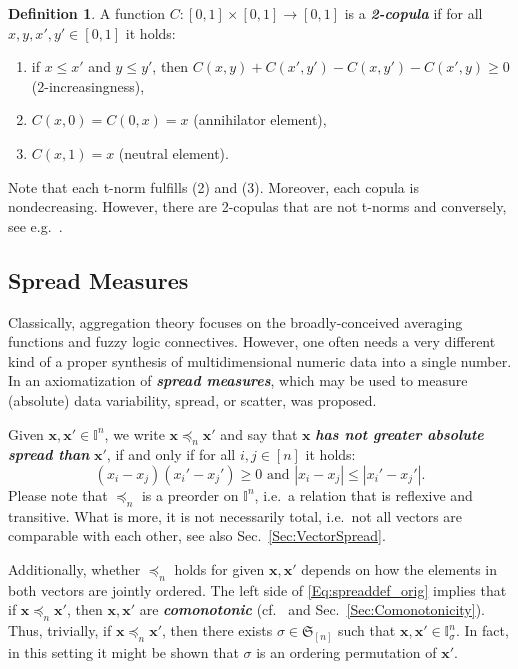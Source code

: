 \documentclass[11pt]{article}\usepackage[]{graphicx}\usepackage[]{color}
\renewcommand{\emph}[1]{\textbf{\textsl{#1}}}
\newcommand{\vect}[1]{{\mathbf{#1}}}
\newcommand{\IvalPow}[1]{\mathbb{I}^{#1}}
\theoremstyle{remark}
\theoremstyle{definition}
\newtheorem{definition}[theorem]{Definition}
\begin{document}
\begin{definition}\label{Def:tnorm}
A function $C: [0,1]\times[0,1]\to[0,1]$ is a \emph{2-copula}
if for all $x,y,x',y'\in[0,1]$ it holds:
\begin{enumerate}
\item if $x\le x'$ and $y\le y'$, then
$C(x,y)+C(x',y')-C(x,y')-C(x',y)\ge 0$ (2-increasingness),
\item $C(x, 0)=C(0,x)=x$ (annihilator element),
\item $C(x, 1)=x$ (neutral element).
\end{enumerate}
\end{definition}
Note that each t-norm fulfills (2) and (3).
Moreover, each copula is nondecreasing. However, there are 2-copulas
that are not t-norms and conversely, see e.g.~\cite{KlementMesiarPap2000:trinorm}.






\subsection{Spread Measures}\label{Sec:SpreadMeasures}


Classically, aggregation theory focuses on
the broadly-conceived averaging functions and fuzzy logic connectives.
However, one often needs a very different kind of a proper
synthesis of multidimensional numeric data into a single number.
In \cite{Gagolewski2015:spread} an axiomatization of
\emph{spread measures}, which may be used to measure (absolute) data
variability, spread, or scatter, was proposed.


Given $\vect{x},\vect{x}'\in\IvalPow{n}$,
we write $\vect{x}\preccurlyeq_n\vect{x}'$
and say that $\vect{x}$ \emph{has not greater absolute spread than} $\vect{x}'$,
if and only if for all $i,j\in[n]$ it holds:
\begin{equation}\label{Eq:spreaddef_orig}
(x_i-x_j)(x_i'-x_j')\ge 0 \text{ and } |x_i-x_j|\le |x_i'-x_j'|.
\end{equation}
Please note that $\preccurlyeq_n$ is a preorder on $\IvalPow{n}$,
i.e.~a relation that is reflexive and transitive.
What is more, it is not necessarily total, i.e.~not all vectors
are comparable with each other, see also Sec.~\ref{Sec:VectorSpread}.

Additionally, whether $\preccurlyeq_n$ holds for given $\vect{x},\vect{x}'$
depends on how the elements in both vectors are jointly ordered.
The left side of \eqref{Eq:spreaddef_orig} implies that
if $\vect{x}\preccurlyeq_n\vect{x}'$, then $\vect{x},\vect{x}'$ are \emph{comonotonic}
(cf.~\cite[Def.~2.123]{GrabischETAL2009:aggregationfunctions}
and Sec.~\ref{Sec:Comonotonicity}).
Thus, trivially, if $\vect{x}\preccurlyeq_n\vect{x}'$,
then there exists $\sigma\in\mathfrak{S}_{[n]}$ such that
$\vect{x},\vect{x}'\in\IvalPow{n}_\sigma$.
In fact, in this setting it might be shown that $\sigma$ is an ordering
permutation of $\vect{x}'$.
\end{document}
